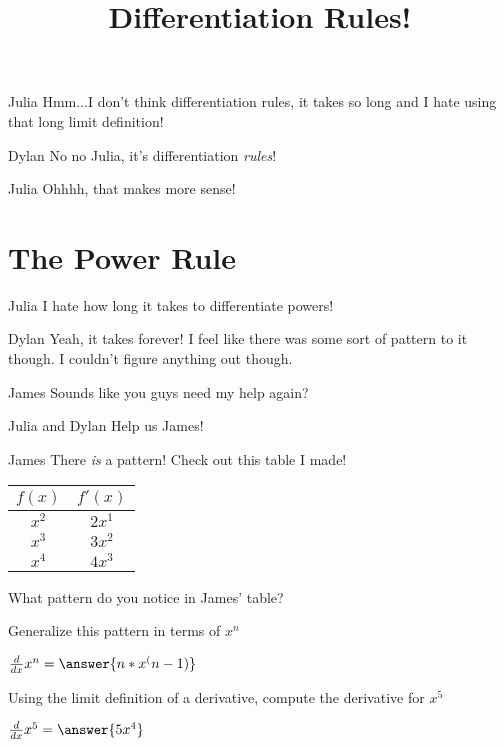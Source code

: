 \documentclass{ximera}
\title{Differentiation Rules!}
\begin{document}
\maketitle
\begin{dialogue}
\item[Julia] Hmm...I don't think differentiation rules, it takes so long and I hate using that long limit definition!
\item[Dylan] No no Julia, it's differentiation \textit{rules}!
\item[Julia] Ohhhh, that makes more sense!

\end{dialogue}
\section{The Power Rule}
\begin{dialogue}
\item[Julia] I hate how long it takes to differentiate powers!
\item[Dylan] Yeah, it takes forever! I feel like there was some sort of pattern to it though. I couldn't figure anything out though.
\item[James] Sounds like you guys need my help again?
\item[Julia and Dylan] Help us James!
\item[James] There \textit{is} a pattern! Check out this table I made!
\begin{center}
\begin{tabular}{c|c}
$f(x)$ & $f'(x)$ \\
\hline
$x^2$ & $2x^1$ \\
$x^3$ & $3x^2$ \\
$x^4$ & $4x^3$
\end{tabular}
\end{center}
\end{dialogue}
\begin{question}
What pattern do you notice in James' table?

\begin{freeResponse}
\end{freeResponse}

Generalize this pattern in terms of $x^n$

$ \frac{d}{dx} x^n =  \answer{n*x^(n-1)}$
\end{question}

\begin{question}
Using the limit definition of a derivative, compute the derivative for $x^5$

$ \frac{d}{dx} x^5 =  \answer{5x^4}$
\end{question}
\end{document}
